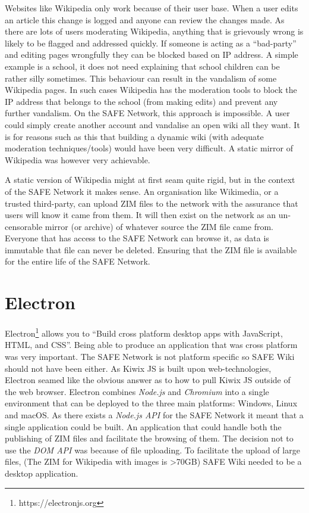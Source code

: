 Websites like Wikipedia only work because of their user base. When a user edits an article this change is logged and anyone can review the changes made. As there are lots of users moderating Wikipedia, anything that is grievously wrong is likely to be flagged and addressed quickly. If someone is acting as a ``bad-party'' and editing pages wrongfully they can be blocked based on IP address. A simple example is a school, it does not need explaining that school children can be rather silly sometimes. This behaviour can result in the vandalism of some Wikipedia pages. In such cases Wikipedia has the moderation tools to block the IP address that belongs to the school (from making edits) and prevent any further vandalism. On the SAFE Network, this approach is impossible. A user could simply create another account and vandalise an open wiki all they want. It is for reasons such as this that building a dynamic wiki (with adequate moderation techniques/tools) would have been very difficult. A static mirror of Wikipedia was however very achievable.

A static version of Wikipedia might at first seam quite rigid, but in the context of the SAFE Network it makes sense. An organisation like Wikimedia, or a trusted third-party, can upload ZIM files to the network with the assurance that users will know it came from them. It will then exist on the network as an un-censorable mirror (or archive) of whatever source the ZIM file came from. Everyone that has access to the SAFE Network can browse it, as data is immutable that file can never be deleted. Ensuring that the ZIM file is available for the entire life of the SAFE Network.

\section{Electron}

Electron\footnote{https://electronjs.org} allows you to ``Build cross platform desktop apps with JavaScript, HTML, and CSS''. Being able to produce an application that was cross platform was very important. The SAFE Network is not platform specific so SAFE Wiki should not have been either. As Kiwix JS is built upon web-technologies, Electron seamed like the obvious answer as to how to pull Kiwix JS outside of the web browser. Electron combines \textit{Node.js} and \textit{Chromium} into a single environment that can be deployed to the three main platforms: Windows, Linux and macOS. As there exists a \textit{Node.js API} for the SAFE Network it meant that a single application could be built. An application that could handle both the publishing of ZIM files and facilitate the browsing of them. The decision not to use the \textit{DOM API} was because of file uploading. To facilitate the upload of large files, (The ZIM for Wikipedia with images is \textgreater 70GB) SAFE Wiki needed to be a desktop application.

